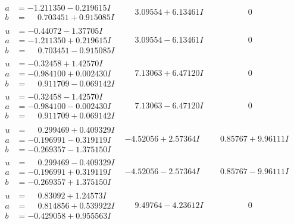 \documentclass[1p]{elsarticle_modified}
\theoremstyle{definition}
\begin{document}
$$\begin{array}{c|c|c}
\begin{aligned}
a &= -1.211350 - 0.219615 I \\
b &= \phantom{-}0.703451 + 0.915085 I\end{aligned}
 & \phantom{-}3.09554 + 6.13461 I & \phantom{-0.000000 } 0 \\ \hline\begin{aligned}
u &= -0.44072 - 1.37705 I \\
a &= -1.211350 + 0.219615 I \\
b &= \phantom{-}0.703451 - 0.915085 I\end{aligned}
 & \phantom{-}3.09554 - 6.13461 I & \phantom{-0.000000 } 0 \\ \hline\begin{aligned}
u &= -0.32458 + 1.42570 I \\
a &= -0.984100 + 0.002430 I \\
b &= \phantom{-}0.911709 - 0.069142 I\end{aligned}
 & \phantom{-}7.13063 + 6.47120 I & \phantom{-0.000000 } 0 \\ \hline\begin{aligned}
u &= -0.32458 - 1.42570 I \\
a &= -0.984100 - 0.002430 I \\
b &= \phantom{-}0.911709 + 0.069142 I\end{aligned}
 & \phantom{-}7.13063 - 6.47120 I & \phantom{-0.000000 } 0 \\ \hline\begin{aligned}
u &= \phantom{-}0.299469 + 0.409329 I \\
a &= -0.196991 - 0.319119 I \\
b &= -0.269357 - 1.375150 I\end{aligned}
 & -4.52056 + 2.57364 I & \phantom{-}0.85767 + 9.96111 I \\ \hline\begin{aligned}
u &= \phantom{-}0.299469 - 0.409329 I \\
a &= -0.196991 + 0.319119 I \\
b &= -0.269357 + 1.375150 I\end{aligned}
 & -4.52056 - 2.57364 I & \phantom{-}0.85767 - 9.96111 I \\ \hline\begin{aligned}
u &= \phantom{-}0.83092 + 1.24573 I \\
a &= \phantom{-}0.814856 + 0.539922 I \\
b &= -0.429058 + 0.955563 I\end{aligned}
 & \phantom{-}9.49764 - 4.23612 I & \phantom{-0.000000 } 0\\

\end{array}$$
\end{document}

